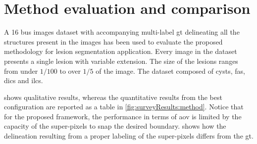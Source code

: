 \graphicspath{ {./content/results/figures/} }



\section{Method evaluation and comparison} 
A 16 \ac{bus} images dataset with accompanying multi-label \ac{gt} delineating all the structures present in the images has been used to evaluate the proposed methodology for lesion segmentation application.
Every image in the dataset presents a single lesion with variable extension. 
The size of the lesions ranges from under $1/100$ to over $1/5$ of the image.
The dataset composed of cysts, \acp{fa}, \acp{dic} and \acp{ilc}.

 shows qualitative results, whereas the quantitative results from the best configuration are reported as a table in \cref{fig:surveyResults:method}. %
Notice that for the proposed framework, the performance in terms of \ac{aov} is limited by the capacity of the super-pixels to snap the desired boundary.
 shows how the delineation resulting from a proper labeling of the super-pixels differs from the \ac{gt}.

